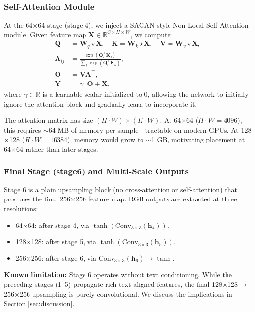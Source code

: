 \documentclass[conference]{IEEEtran}
\begin{document}
\subsubsection{Self-Attention Module}
\label{sec:self-attn}
At the 64$\times$64 stage (stage 4), we inject a SAGAN-style Non-Local Self-Attention module. Given feature map $\mathbf{X} \in \mathbb{R}^{C \times H \times W}$, we compute:
\begin{align}
    \mathbf{Q} &= \mathbf{W}_q \star \mathbf{X}, \quad \mathbf{K} = \mathbf{W}_k \star \mathbf{X}, \quad \mathbf{V} = \mathbf{W}_v \star \mathbf{X}, \\
    \mathbf{A}_{ij} &= \frac{\exp(\mathbf{Q}_i^\top \mathbf{K}_j)}{\sum_k \exp(\mathbf{Q}_i^\top \mathbf{K}_k)}, \\
    \mathbf{O} &= \mathbf{V} \mathbf{A}^\top, \\
    \mathbf{Y} &= \gamma \cdot \mathbf{O} + \mathbf{X},
\end{align}
where $\gamma \in \mathbb{R}$ is a learnable scalar initialized to 0, allowing the network to initially ignore the attention block and gradually learn to incorporate it.

The attention matrix has size $(H \cdot W) \times (H \cdot W)$. At 64$\times$64 ($H \cdot W = 4096$), this requires $\sim$64 MB of memory per sample---tractable on modern GPUs. At 128$\times$128 ($H \cdot W = 16384$), memory would grow to $\sim$1 GB, motivating placement at 64$\times$64 rather than later stages.

\subsubsection{Final Stage (stage6) and Multi-Scale Outputs}
Stage 6 is a plain upsampling block (no cross-attention or self-attention) that produces the final 256$\times$256 feature map. RGB outputs are extracted at three resolutions:
\begin{itemize}
    \item 64$\times$64: after stage 4, via $\tanh(\text{Conv}_{3\times3}(\mathbf{h}_4))$.
    \item 128$\times$128: after stage 5, via $\tanh(\text{Conv}_{3\times3}(\mathbf{h}_5))$.
    \item 256$\times$256: after stage 6, via $\text{Conv}_{3\times3}(\mathbf{h}_6) \rightarrow \tanh$.
\end{itemize}

\textbf{Known limitation:} Stage 6 operates without text conditioning. While the preceding stages (1--5) propagate rich text-aligned features, the final 128$\times$128$\rightarrow$256$\times$256 upsampling is purely convolutional. We discuss the implications in Section \ref{sec:discussion}.
\end{document}
